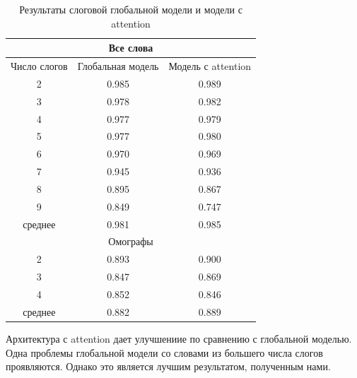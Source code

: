 \documentclass[14pt, a4paper, russian]{extreport}
\begin{document}
\begin{table}[H]
	\caption{Результаты слоговой глобальной модели и модели с attention}
	
	\begin{small}
		\begin{center}
			\begin{tabular}{|c | c| c |}
				\hline
								\multicolumn{3}{|c|}{Все слова}                                       \\ \hline
				
				Число слогов & Глобальная модель & Модель с attention \\ \hline
				     2       & 0.985             & 0.989              \\ \hline
				     3       & 0.978             & 0.982              \\ \hline
				     4       & 0.977             & 0.979              \\ \hline
				     5       & 0.977             & 0.980              \\ \hline
				     6       & 0.970             & 0.969              \\ \hline
				     7       & 0.945             & 0.936              \\ \hline
				     8       & 0.895             & 0.867              \\ \hline
				     9       & 0.849             & 0.747              \\ \hline
				  среднее    & 0.981             & 0.985              \\ \hline
				  				\multicolumn{3}{|c|}{Омографы}                                       \\ \hline
				  
				     2       & 0.893             & 0.900              \\ \hline
				     3       & 0.847             & 0.869              \\ \hline
				     4       & 0.852             & 0.846              \\ \hline
				  среднее    & 0.882             & 0.889              \\ \hline
			\end{tabular}
		\end{center}
	\end{small}
	\label{table:global_att}
\end{table}



Архитектура с attention дает улучшениие по сравнению с глобальной моделью. Одна проблемы глобальной модели со словами из большего числа слогов проявляются. Однако это является лучшим результатом, полученным нами.
\end{document}
